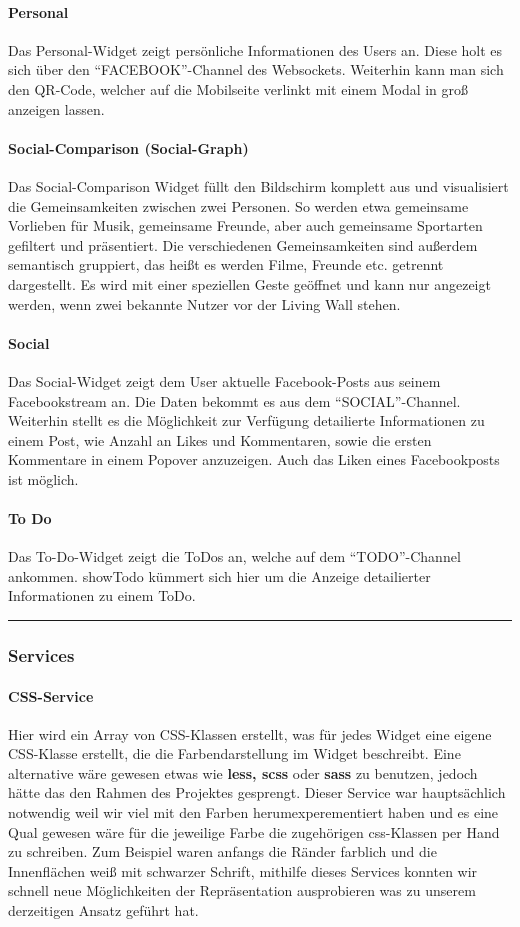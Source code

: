 \documentclass[10pt,a4paper]{report}
\newcommand{\code}[1]{{\fontfamily{cmvtt}\selectfont #1}}
\newcommand{\HRule}{\rule{\linewidth}{0.1pt}} %
\begin{document}
				\paragraph{Personal}
					Das Personal-Widget zeigt persönliche Informationen des Users an. Diese holt es sich über den "`FACEBOOK"'-Channel des Websockets. Weiterhin kann man sich den QR-Code, welcher auf die Mobilseite verlinkt mit einem Modal in groß anzeigen lassen.
				\paragraph{Social-Comparison (Social-Graph)}
					Das Social-Comparison Widget füllt den Bildschirm komplett aus und visualisiert die Gemeinsamkeiten zwischen zwei Personen. So werden etwa gemeinsame Vorlieben für Musik, gemeinsame Freunde, aber auch gemeinsame Sportarten gefiltert und präsentiert. Die verschiedenen Gemeinsamkeiten sind außerdem semantisch gruppiert, das heißt es werden Filme, Freunde etc. getrennt dargestellt. Es wird mit einer speziellen Geste geöffnet und kann nur angezeigt werden, wenn zwei bekannte Nutzer vor der Living Wall stehen.
				\paragraph{Social}
					Das Social-Widget zeigt dem User aktuelle Facebook-Posts aus seinem Facebookstream an. Die Daten bekommt es aus dem "`SOCIAL"'-Channel. Weiterhin stellt es die Möglichkeit zur Verfügung detailierte Informationen zu einem Post, wie Anzahl an Likes und Kommentaren, sowie die ersten Kommentare in einem Popover anzuzeigen. Auch das Liken eines Facebookposts ist möglich.
				\paragraph{To Do}
					Das To-Do-Widget zeigt die ToDos an, welche auf dem "`TODO"'-Channel ankommen. \code{showTodo} kümmert sich hier um die Anzeige detailierter Informationen zu einem ToDo.\\
				\HRule
			\subsubsection{Services}
				\paragraph{CSS-Service}
					Hier wird ein Array von CSS-Klassen erstellt, was für jedes Widget eine eigene CSS-Klasse erstellt, die die Farbendarstellung im Widget beschreibt.
					Eine alternative wäre gewesen etwas wie \textbf{less, scss} oder \textbf{sass} zu benutzen, jedoch hätte das den Rahmen des Projektes gesprengt.
					Dieser Service war hauptsächlich notwendig weil wir viel mit den Farben herumexperementiert haben und es eine Qual gewesen wäre für die jeweilige Farbe die zugehörigen css-Klassen per Hand zu schreiben. Zum Beispiel waren anfangs die Ränder farblich und die Innenflächen weiß mit schwarzer Schrift, mithilfe dieses Services konnten wir schnell neue Möglichkeiten der Repräsentation ausprobieren was zu unserem derzeitigen Ansatz geführt hat.
\end{document}
